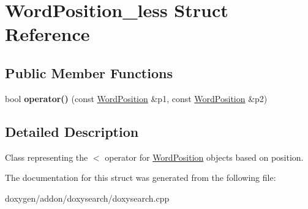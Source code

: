 \hypertarget{struct_word_position__less}{}\section{Word\+Position\+\_\+less Struct Reference}
\label{struct_word_position__less}
\subsection*{Public Member Functions}
\begin{DoxyCompactItemize}
\item 
\mbox{\label{struct_word_position__less_a8bd09dcd99c2e3fc0729efd0949ab0e0}} 
bool {\bfseries operator()} (const \mbox{\hyperlink{struct_word_position}{Word\+Position}} \&p1, const \mbox{\hyperlink{struct_word_position}{Word\+Position}} \&p2)
\end{DoxyCompactItemize}


\subsection{Detailed Description}
Class representing the \textquotesingle{}$<$\textquotesingle{} operator for \mbox{\hyperlink{struct_word_position}{Word\+Position}} objects based on position. 

The documentation for this struct was generated from the following file\+:\begin{DoxyCompactItemize}
\item 
doxygen/addon/doxysearch/doxysearch.\+cpp\end{DoxyCompactItemize}
